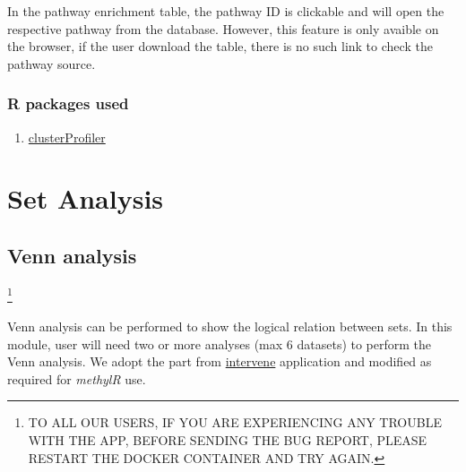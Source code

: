 \documentclass[
  a4paper,
  oneside,
  open=any]{scrreport}
\providecommand{\tightlist}{%
  \setlength{\itemsep}{0pt}\setlength{\parskip}{0pt}}\usepackage{longtable,booktabs,array}
\begin{document}
\begin{tcolorbox}[enhanced jigsaw, bottomrule=.15mm, left=2mm, coltitle=black, breakable, colback=white, arc=.35mm, rightrule=.15mm, opacitybacktitle=0.6, toptitle=1mm, leftrule=.75mm, toprule=.15mm, bottomtitle=1mm, opacityback=0, colbacktitle=quarto-callout-warning-color!10!white, titlerule=0mm, colframe=quarto-callout-warning-color-frame, title=\textcolor{quarto-callout-warning-color}{\faExclamationTriangle}\hspace{0.5em}{Warning}]

In the pathway enrichment table, the pathway ID is clickable and will
open the respective pathway from the database. However, this feature is
only avaible on the browser, if the user download the table, there is no
such link to check the pathway source.

\end{tcolorbox}

\hypertarget{r-packages-used-5}{%
\section{R packages used}\label{r-packages-used-5}}

\begin{enumerate}
\def\labelenumi{\arabic{enumi}.}
\tightlist
\item
  \href{https://bioconductor.org/packages/release/bioc/vignettes/clusterProfiler/inst/doc/clusterProfiler.html}{clusterProfiler}
\end{enumerate}

\part{Set Analysis}

\hypertarget{sec-venn}{%
\chapter{Venn analysis}\label{sec-venn}}

\footnote{TO ALL OUR USERS, IF YOU ARE EXPERIENCING ANY TROUBLE WITH THE
  APP, BEFORE SENDING THE BUG REPORT, PLEASE RESTART THE DOCKER
  CONTAINER AND TRY AGAIN.}

Venn analysis can be performed to show the logical relation between
sets. In this module, user will need two or more analyses (max 6
datasets) to perform the Venn analysis. We adopt the part from
\href{https://github.com/asntech/intervene}{intervene}
\autocite{khan2017intervene} application and modified as required for
\emph{methylR} use.
\end{document}
